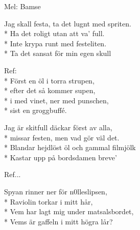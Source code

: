 \begin{SongText}
    \begin{SongInfo}
        Mel: Bamse
    \end{SongInfo}
    \begin{SongVerse}
        Jag skall festa, ta det lugnt med spriten.\\*%
        Ha det roligt utan att va’ full.\\*%
        Inte krypa runt med festeliten.\\*%
        Ta det sansat för min egen skull
    \end{SongVerse}
    \begin{SongVerse}
        Ref:\\*%
        Först en öl i torra strupen,\\*%
        efter det så kommer supen,\\*%
        i med vinet, ner med punschen,\\*%
        sist en groggbuffé.
    \end{SongVerse}
    \begin{SongVerse}
        Jag är skitfull däckar först av alla,\\*%
        missar festen, men vad gör väl det.\\*%
        Blandar hejdlöst öl och gammal filmjölk\\*%
        Kastar upp på bordsdamen breve’
    \end{SongVerse}
    \begin{SongVerse}
        Ref...
    \end{SongVerse}
    \begin{SongVerse}
        Spyan rinner ner för n0lleslipsen,\\*%
        Raviolin torkar i mitt hår,\\*%
        Vem har lagt mig under matsalsbordet,\\*%
        Vems är gaffeln i mitt högra lår?
    \end{SongVerse}
\end{SongText}
